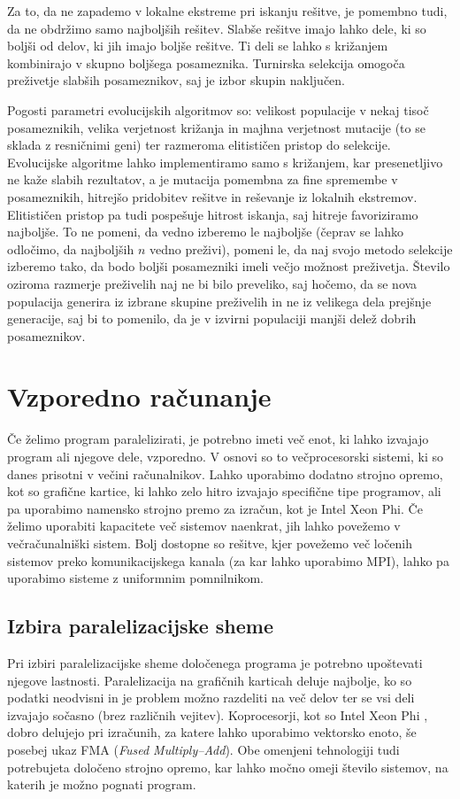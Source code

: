 \documentclass[a4paper,12pt]{book}
\begin{document}
Za to, da ne zapademo v lokalne ekstreme pri iskanju rešitve, je pomembno tudi, da ne obdržimo samo najboljših rešitev. Slabše rešitve imajo lahko dele, ki so boljši od delov, ki jih imajo boljše rešitve. Ti deli se lahko s križanjem kombinirajo v skupno boljšega posameznika. Turnirska selekcija omogoča preživetje slabših posameznikov, saj je izbor skupin naključen. 

Pogosti parametri evolucijskih algoritmov so: velikost populacije v nekaj tisoč posameznikih, velika verjetnost križanja in majhna verjetnost mutacije (to se sklada z resničnimi geni) ter razmeroma elitističen pristop do selekcije. Evolucijske algoritme lahko implementiramo samo s križanjem, kar presenetljivo ne kaže slabih rezultatov, a je mutacija pomembna za fine spremembe v posameznikih, hitrejšo pridobitev rešitve in reševanje iz lokalnih ekstremov. Elitističen pristop pa tudi pospešuje hitrost iskanja, saj hitreje favoriziramo najboljše. To ne pomeni, da vedno izberemo le najboljše (čeprav se lahko odločimo, da najboljših $n$ vedno preživi), pomeni le, da naj svojo metodo selekcije izberemo tako, da bodo boljši posamezniki imeli večjo možnost preživetja. Število oziroma razmerje preživelih naj ne bi bilo preveliko, saj hočemo, da se nova populacija generira iz izbrane skupine preživelih in ne iz velikega dela prejšnje generacije, saj bi to pomenilo, da je v izvirni populaciji manjši delež dobrih posameznikov. 



\section{Vzporedno računanje}
Če želimo program paralelizirati, je potrebno imeti več enot, ki lahko izvajajo program ali njegove dele, vzporedno. V osnovi so to večprocesorski sistemi, ki so danes prisotni v večini računalnikov. Lahko uporabimo dodatno strojno opremo, kot so grafične kartice, ki lahko zelo hitro izvajajo specifične tipe programov, ali pa uporabimo namensko strojno premo za izračun, kot je Intel Xeon Phi. Če želimo uporabiti kapacitete več sistemov naenkrat, jih lahko povežemo v večračunalniški sistem. Bolj dostopne so rešitve, kjer povežemo več ločenih sistemov preko komunikacijskega kanala (za kar lahko uporabimo MPI), lahko pa uporabimo sisteme z uniformnim pomnilnikom. 

\subsection{Izbira paralelizacijske sheme}
Pri izbiri paralelizacijske sheme določenega programa je potrebno upoštevati njegove lastnosti. Paralelizacija na grafičnih karticah deluje najbolje, ko so podatki neodvisni in je problem možno razdeliti na več delov ter se vsi deli izvajajo sočasno (brez različnih vejitev). Koprocesorji, kot so Intel Xeon Phi \cite{xeonphi}, dobro delujejo pri izračunih, za katere lahko uporabimo vektorsko enoto, še posebej ukaz FMA (\emph{Fused Multiply--Add}). Obe omenjeni tehnologiji tudi potrebujeta določeno strojno opremo, kar lahko močno omeji število sistemov, na katerih je možno pognati program.
\end{document}
